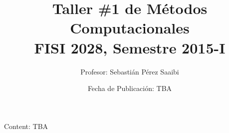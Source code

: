 \documentclass{article}
\title{Taller \#1 de M\'etodos Computacionales\\ FISI 2028, Semestre 2015-I}
\author{Profesor: Sebasti\'an P\'erez Saaibi}
\date{Fecha de Publicación: TBA}
\begin{document}
\maketitle
\thispagestyle{empty}


Content: TBA

%
%
%
%
%
%
%
%
%
%
%
\end{document}
